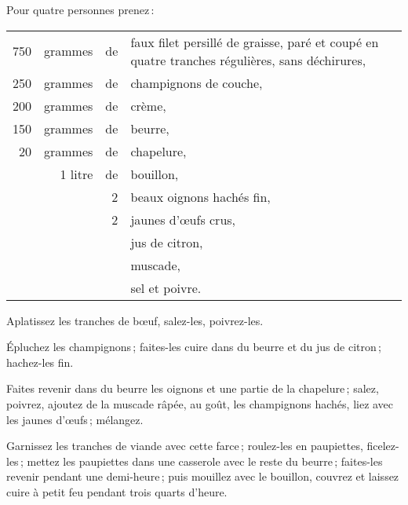 Pour quatre personnes prenez :

\medskip

\footnotesize
\begin{longtable}{rrrp{16em}}
    750 & grammes & de & faux filet persillé de graisse, paré et coupé
                         en quatre tranches régulières, sans déchirures,                                  \\
    250 & grammes & de & champignons de couche,                                                           \\
    200 & grammes & de & crème,                                                                           \\
    150 & grammes & de & beurre,                                                                          \\
     20 & grammes & de & chapelure,                                                                       \\
        & 1 litre & de & bouillon,                                                                        \\
        &         &  2 & beaux oignons hachés fin,                                                        \\
        &         &  2 & jaunes d'œufs crus,                                                              \\
        &         &    & jus de citron,                                                                   \\
        &         &    & muscade,                                                                         \\
        &         &    & sel et poivre.                                                                   \\
\end{longtable}
\normalsize

Aplatissez les tranches de bœuf, salez-les, poivrez-les.

Épluchez les champignons ; faites-les cuire dans du beurre et du jus de
citron ; hachez-les fin.

Faites revenir dans du beurre les oignons et une partie de la chapelure ;
salez, poivrez, ajoutez de la muscade râpée, au goût, les champignons hachés,
liez avec les jaunes d'œufs ; mélangez.

Garnissez les tranches de viande avec cette farce ; roulez-les en paupiettes,
ficelez-les ; mettez les paupiettes dans une casserole avec le reste du
beurre ; faites-les revenir pendant une demi-heure ; puis mouillez avec le
bouillon, couvrez et laissez cuire à petit feu pendant trois quarts d'heure.

